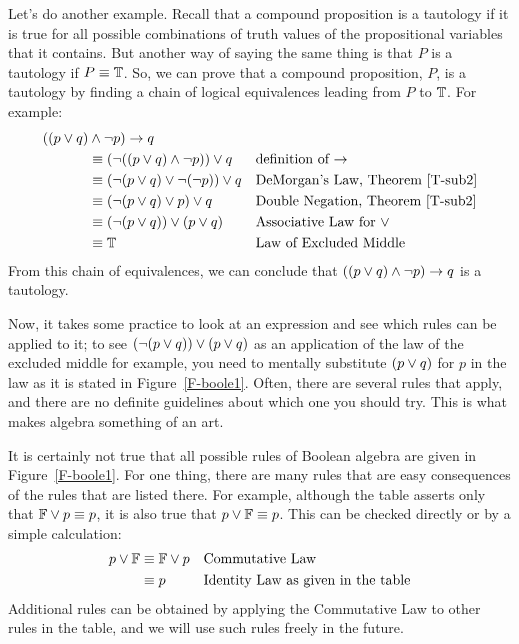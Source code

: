 Let's do another example.  Recall that a compound proposition is a
tautology if it is true for all possible combinations of truth values
of the propositional variables that it contains.  But another way
of saying the same thing is that $P$ is a tautology if $P\equiv\mathbb{T}$.
So, we can prove that a compound proposition, $P$, is a tautology by
finding a chain of logical equivalences leading from $P$ to $\mathbb{T}$.
For example:
\begin{align*}
   ((p\vee q) &\wedge \lnot p)\rightarrow q &&\\
      &\equiv (\lnot((p\vee q)\wedge\lnot p))\vee q &&\text{definition of $\rightarrow$}\\
      &\equiv (\lnot(p\vee q) \vee \lnot (\lnot p))\vee q                     &&\text{DeMorgan's Law, Theorem \ref{T-sub2}}\\
      &\equiv (\lnot(p\vee q) \vee p)\vee q                                 &&\text{Double Negation, Theorem \ref{T-sub2}}\\
      &\equiv (\lnot (p\vee q)) \vee (p\vee q)                              &&\text{Associative Law for $\vee$}\\
      &\equiv \mathbb{T}                                                        &&\text{Law of Excluded Middle}\\
\end{align*}
From this chain of equivalences, we can conclude that $((p\vee q) \wedge \lnot p)\rightarrow q$
is a tautology.

Now, it takes some practice to look at an expression and see which
rules can be applied to it; to see $(\lnot (p\vee q)) \vee (p\vee q)$
as an application of the law of the excluded middle for example,
you need to mentally substitute $(p\vee q)$ for $p$ in the law as it is stated
in Figure~\ref{F-boole1}.  Often, there are several rules that
apply, and there are no definite guidelines about which one you
should try.  This is what makes algebra something of an art.


\medbreak

It is certainly not true that all possible rules of Boolean algebra are given
in Figure~\ref{F-boole1}.  For one thing, there are many rules that are easy
consequences of the rules that are listed there.  For example, although the
table asserts only that $\mathbb{F}\vee p\equiv p$, it is also true that
$p\vee\mathbb{F}\equiv p$.  This can be checked directly or by a simple calculation:
\begin{align*}
p\vee\mathbb{F} &\equiv \mathbb{F}\vee p &&\text{Commutative Law}\\
        &\equiv p        &&\text{Identity Law as given in the table}\\
\end{align*}
Additional rules can be obtained by applying the Commutative Law to other
rules in the table, and we will use such rules freely in the future.

